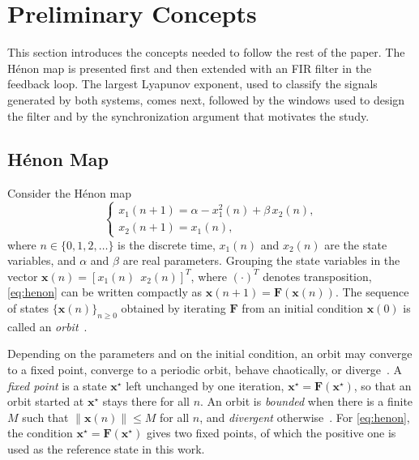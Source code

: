 \documentclass[journal]{IEEEtran}
\begin{document}
\section{Preliminary Concepts}\label{sec:prelim}
This section introduces the concepts needed to follow the rest of the paper.
The H\'enon map is presented first and then extended with an FIR filter in
the feedback loop. The largest Lyapunov exponent, used to classify the
signals generated by both systems, comes next, followed by the windows used
to design the filter and by the synchronization argument that motivates the
study.

\subsection{H\'enon Map}\label{sub:henon}
Consider the H\'enon map~\cite{Henon1976}
\begin{equation}
  \begin{cases}
    x_1(n+1) = \alpha - x_1^2(n) + \beta\, x_2(n), \\
    x_2(n+1) = x_1(n),
  \end{cases}
  \label{eq:henon}
\end{equation}
where $n\in\{0,1,2,\ldots\}$ is the discrete time, $x_1(n)$ and $x_2(n)$ are
the state variables, and $\alpha$ and $\beta$ are real parameters. Grouping
the state variables in the vector $\mathbf{x}(n)=[x_1(n)\;\,x_2(n)]^{T}$,
where $(\cdot)^{T}$ denotes transposition, \eqref{eq:henon} can be written
compactly as $\mathbf{x}(n+1)=\mathbf{F}(\mathbf{x}(n))$. The sequence of
states $\{\mathbf{x}(n)\}_{n\ge 0}$ obtained by iterating $\mathbf{F}$ from an
initial condition $\mathbf{x}(0)$ is called an \emph{orbit}~\cite{Alligood1996}.

Depending on the parameters and on the initial condition, an orbit may
converge to a fixed point, converge to a periodic orbit, behave chaotically,
or diverge~\cite{Alligood1996}. A \emph{fixed point} is a state
$\mathbf{x}^\star$ left unchanged by one iteration,
$\mathbf{x}^\star=\mathbf{F}(\mathbf{x}^\star)$, so that an orbit started at
$\mathbf{x}^\star$ stays there for all $n$. An orbit is \emph{bounded} when
there is a finite $M$ such that $\|\mathbf{x}(n)\|\le M$ for all $n$, and
\emph{divergent} otherwise~\cite{Alligood1996}. For \eqref{eq:henon}, the
condition $\mathbf{x}^\star=\mathbf{F}(\mathbf{x}^\star)$ gives two fixed
points, of which the positive one is used as the reference state in this
work.
\end{document}
